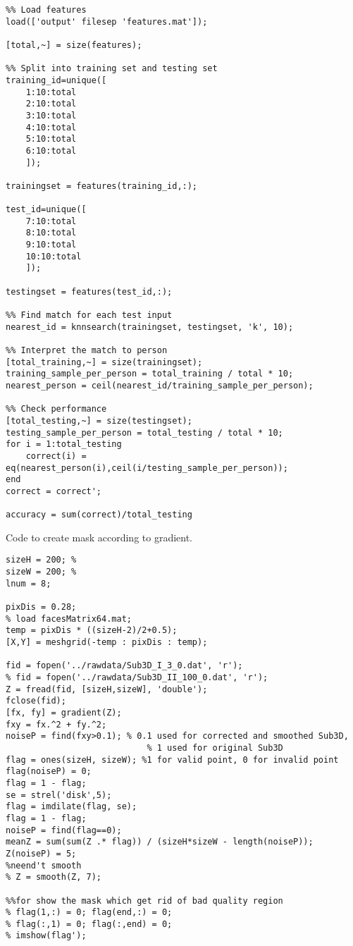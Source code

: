 \begin{verbatim}
%% Load features
load(['output' filesep 'features.mat']);

[total,~] = size(features);

%% Split into training set and testing set
training_id=unique([
    1:10:total
    2:10:total
    3:10:total
    4:10:total
    5:10:total
    6:10:total
    ]);

trainingset = features(training_id,:);

test_id=unique([
    7:10:total
    8:10:total
    9:10:total
    10:10:total
    ]);

testingset = features(test_id,:);

%% Find match for each test input
nearest_id = knnsearch(trainingset, testingset, 'k', 10);

%% Interpret the match to person
[total_training,~] = size(trainingset);
training_sample_per_person = total_training / total * 10;
nearest_person = ceil(nearest_id/training_sample_per_person);

%% Check performance
[total_testing,~] = size(testingset);
testing_sample_per_person = total_testing / total * 10;
for i = 1:total_testing
    correct(i) = eq(nearest_person(i),ceil(i/testing_sample_per_person));
end
correct = correct';

accuracy = sum(correct)/total_testing
\end{verbatim}
\clearpage

Code to create mask according to gradient.

\begin{verbatim}
sizeH = 200; %
sizeW = 200; %
lnum = 8;

pixDis = 0.28;
% load facesMatrix64.mat;
temp = pixDis * ((sizeH-2)/2+0.5);
[X,Y] = meshgrid(-temp : pixDis : temp);

fid = fopen('../rawdata/Sub3D_I_3_0.dat', 'r');
% fid = fopen('../rawdata/Sub3D_II_100_0.dat', 'r');
Z = fread(fid, [sizeH,sizeW], 'double');
fclose(fid);
[fx, fy] = gradient(Z);
fxy = fx.^2 + fy.^2;
noiseP = find(fxy>0.1); % 0.1 used for corrected and smoothed Sub3D,
							% 1 used for original Sub3D
flag = ones(sizeH, sizeW); %1 for valid point, 0 for invalid point
flag(noiseP) = 0;
flag = 1 - flag;
se = strel('disk',5);  
flag = imdilate(flag, se);
flag = 1 - flag;
noiseP = find(flag==0);
meanZ = sum(sum(Z .* flag)) / (sizeH*sizeW - length(noiseP));
Z(noiseP) = 5;
%neend't smooth
% Z = smooth(Z, 7);

%%for show the mask which get rid of bad quality region
% flag(1,:) = 0; flag(end,:) = 0;
% flag(:,1) = 0; flag(:,end) = 0;
% imshow(flag');
\end{verbatim}
\clearpage

